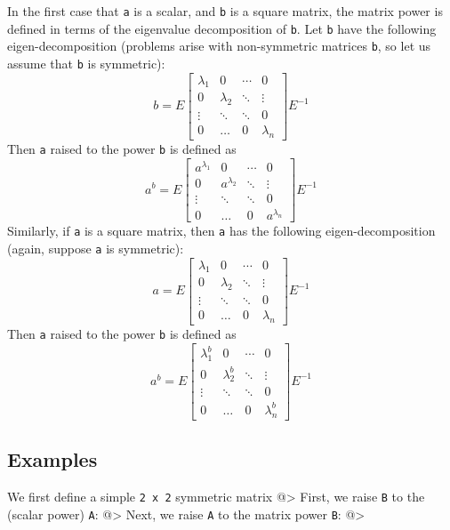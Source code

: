 In the first case that \verb|a| is a scalar, and \verb|b| is a square matrix, the matrix power is defined in terms of the eigenvalue decomposition of \verb|b|.  Let \verb|b| have the following eigen-decomposition (problems arise with non-symmetric matrices \verb|b|, so let us assume that \verb|b| is symmetric):
\[
  b = E \begin{bmatrix} \lambda_1 & 0          & \cdots  & 0 \\                            0   & \lambda_2  &  \ddots & \vdots \\                                         \vdots & \ddots & \ddots & 0 \\                                                 0   & \hdots & 0 & \lambda_n \end{bmatrix}
      E^{-1}
\]
Then \verb|a| raised to the power \verb|b| is defined as
\[
  a^{b} = E \begin{bmatrix} a^{\lambda_1} & 0          & \cdots  & 0 \\                                0   & a^{\lambda_2}  &  \ddots & \vdots \\                                    \vdots & \ddots & \ddots & 0 \\                                             0   & \hdots & 0 & a^{\lambda_n} \end{bmatrix}
      E^{-1}
\]
Similarly, if \verb|a| is a square matrix, then \verb|a| has the following eigen-decomposition (again, suppose \verb|a| is symmetric):
\[
  a = E \begin{bmatrix} \lambda_1 & 0          & \cdots  & 0 \\                                0   & \lambda_2  &  \ddots & \vdots \\                                         \vdots & \ddots & \ddots & 0 \\                                          0   & \hdots & 0 & \lambda_n \end{bmatrix}
      E^{-1}
\]
Then \verb|a| raised to the power \verb|b| is defined as
\[
  a^{b} = E \begin{bmatrix} \lambda_1^b & 0          & \cdots  & 0 \\                              0   & \lambda_2^b  &  \ddots & \vdots \\                              \vdots & \ddots & \ddots & 0 \\                              0   & \hdots & 0 & \lambda_n^b \end{bmatrix}
      E^{-1}
\]
\subsection{Examples}

We first define a simple \verb|2 x 2| symmetric matrix
@>
First, we raise \verb|B| to the (scalar power) \verb|A|:
@>
Next, we raise \verb|A| to the matrix power \verb|B|:
@>
